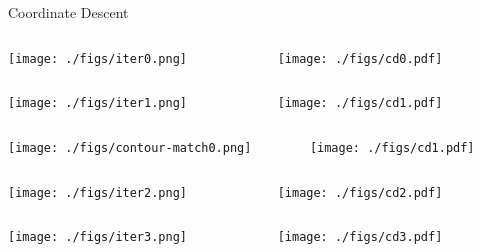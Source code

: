 \documentclass{beamer}
\begin{document}
\begin{frame}[allowframebreaks]{Coordinate Descent}
\begin{columns}
\begin{column}{0.45\textwidth}\texttt{[image: ./figs/iter0.png]}\end{column}
\begin{column}{0.7\textwidth}\texttt{[image: ./figs/cd0.pdf]}\end{column}
\end{columns}
\begin{columns}
\begin{column}{0.45\textwidth}\texttt{[image: ./figs/iter1.png]}\end{column}
\begin{column}{0.7\textwidth}\texttt{[image: ./figs/cd1.pdf]}\end{column}
\end{columns}
\begin{columns}
\begin{column}{0.45\textwidth}\texttt{[image: ./figs/contour-match0.png]}\end{column}
\begin{column}{0.7\textwidth}\texttt{[image: ./figs/cd1.pdf]}\end{column}
\end{columns}
\begin{columns}
\begin{column}{0.45\textwidth}\texttt{[image: ./figs/iter2.png]}\end{column}
\begin{column}{0.7\textwidth}\texttt{[image: ./figs/cd2.pdf]}\end{column}
\end{columns}
\begin{columns}
\begin{column}{0.45\textwidth}\texttt{[image: ./figs/iter3.png]}\end{column}
\begin{column}{0.7\textwidth}\texttt{[image: ./figs/cd3.pdf]}\end{column}
\end{columns}
\begin{columns}

\end{columns}
\end{frame}
\end{document}
